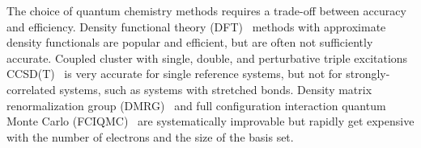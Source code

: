 \documentclass[%
reprint,
 superscriptaddress,
 amsmath,amssymb,
 aps,
]{revtex4-1}
\begin{document}
The choice of quantum chemistry methods requires a trade-off between accuracy and efficiency.
Density functional theory
(DFT)~\cite{ParYan-BOOK-89,DreGro-BOOK-90,kohn1999nobel}
methods with approximate density functionals
are popular and efficient, but are often not sufficiently accurate.  Coupled cluster with single, double, and perturbative triple excitations CCSD(T)~\cite{raghavachari1989fifth} is very accurate for single reference systems, but
not for strongly-correlated systems, such as systems with stretched bonds.
Density matrix renormalization group (DMRG)~\cite{white1993density,white1999ab,chan2002highly,chan2011density,ShaCha-JCP-12,olivares2015ab,schollwock2005density,GuoLiCha-JCTC-18}
and full configuration interaction quantum Monte Carlo (FCIQMC)~\cite{BooThoAla-JCP-09,CleBooAla-JCP-10,PetHolChaNigUmr-PRL-12,BooGruKreAla-Nat-13,HolChaUmr-JCTC-16}
are systematically improvable but rapidly get expensive with the number of electrons and the size of the basis set.

\end{document}
